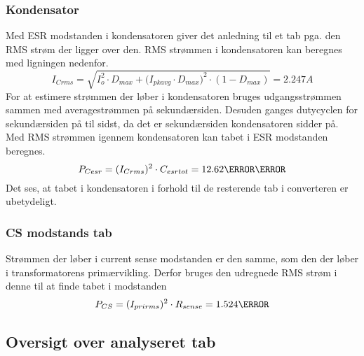 \subsubsection{Kondensator}
Med ESR modstanden i kondensatoren giver det anledning til et tab pga. den RMS strøm der ligger over den.  RMS strømmen i kondensatoren kan beregnes med ligningen nedenfor. 
\begin{equation} \label{kondensatorrms}
I_{C rms} = \sqrt{I_o^{2}\cdot D_{max}+(I_{pkavg}\cdot {D_{max})}^{2}\cdot (1-D_{max})} = 2.247A
\end{equation}  
For at estimere strømmen der løber i kondensatoren bruges udgangsstrømmen sammen med averagestrømmen på sekundærsiden. Desuden ganges dutycyclen for sekundærsiden på til sidst, da det er sekundærsiden kondensatoren sidder på.
Med RMS strømmen igennem kondensatoren kan tabet i ESR modstanden beregnes.
\begin{equation} \label{kondensatortab}
P_{Cesr} = (I_{C rms})^2 \cdot C_{esrtot} = 12.62\milli\watt
\end{equation}
Det ses, at tabet i kondensatoren i forhold til de resterende tab i converteren er ubetydeligt. 

\subsubsection{CS modstands tab}
Strømmen der løber i current sense modstanden er den samme, som den der løber i transformatorens primærvikling. Derfor bruges den udregnede RMS strøm i denne til at finde tabet i modstanden
\begin{equation} \label{kondensatortab}
P_{CS} = (I_{prirms})^2 \cdot R_{sense} = 1.524\watt
\end{equation}

\subsection{Oversigt over analyseret tab}


